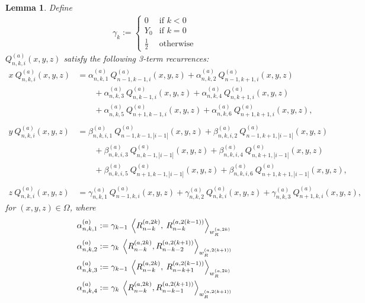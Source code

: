 \documentclass[11pt, oneside]{article}   	%
\newcommand{\half}{\frac{1}{2}}
\newcommand{\genjac}{R}
\newcommand{\genjacnmk}{\genjac_{n-k}}
\newcommand{\genjacw}{w_\genjac}
\newcommand{\scop}{Q}
\newcommand{\scopnki}{\scop_{n,k,i}}
\newcommand{\scopa}{\scop^{(a)}}
\newcommand{\scopnkia}{\scopnki^{(a)}}
\newcommand{\ch}{Y}
\newcommand{\alphaa}{\alpha^{(a)}}
\newcommand{\betaa}{\beta^{(a)}}
\newcommand{\gammaa}{\gamma^{(a)}}
\newtheorem{lemma}{Lemma}
\begin{document}
\begin{lemma}\label{lemma:Qrecurrence} 
Define
\begin{align}
	\gamma_{k} :=
		\begin{cases}
			0 &\text{if } k < 0 \\
			\ch_0 &\text{if } k = 0 \\
			\half &\text{otherwise}
		\end{cases}
\end{align}
$\scopnkia(x,y,z)$ satisfy the following 3-term recurrences:
\begin{align*}
	x \: \scopnkia(x,y,z) &= \alphaa_{n,k,1} \:  \scopa_{n-1, k-1, i}(x, y, z) + \alphaa_{n,k,2} \:  \scopa_{n-1, k+1, i}(x, y, z) \nonumber \\
		& \quad \quad + \alphaa_{n,k,3} \:  \scopa_{n, k-1, i}(x, y, z) + \alphaa_{n,k,4} \:  \scopa_{n, k+1, i}(x, y, z) \nonumber \\
		& \quad \quad + \alphaa_{n,k,5} \:  \scopa_{n+1, k-1, i}(x, y, z) + \alphaa_{n,k,6} \:  \scopa_{n+1, k+1, i}(x, y, z), \\ \\
	y \: \scopnkia(x,y,z) &= \betaa_{n,k,i,1} \:  \scopa_{n-1, k-1, |i-1|}(x, y, z) + \betaa_{n,k,i,2} \:  \scopa_{n-1, k+1, |i-1|}(x, y, z) \nonumber \\
		& \quad \quad + \betaa_{n,k,i,3} \:  \scopa_{n, k-1, |i-1|}(x, y, z) + \betaa_{n,k,i,4} \:  \scopa_{n, k+1, |i-1|}(x, y, z) \nonumber \\
		& \quad \quad + \betaa_{n,k,i,5} \:  \scopa_{n+1, k-1, |i-1|}(x, y, z) + \betaa_{n,k,i,6} \:  \scopa_{n+1, k+1, |i-1|}(x, y, z), \\ \\
	z \: \scopnkia(x,y,z) &= \gammaa_{n,k,1} \: \scopa_{n-1, k, i}(x, y, z) + \gammaa_{n,k,2} \: \scopa_{n, k, i}(x, y, z) + \gammaa_{n,k,3} \: \scopa_{n+1, k, i}(x, y, z),
\end{align*}
for $(x,y,z) \in \Omega$, where
\begin{align*}
	\alphaa_{n,k,1} &:= \gamma_{k-1} \: \ip<\genjacnmk^{(a, 2k)}, \: \genjacnmk^{(a, 2(k-1))}>_{\genjacw^{(a, 2k)}} \\
	\alphaa_{n,k,2} &:= \gamma_{k} \: \ip<\genjacnmk^{(a, 2k)}, \genjac_{n-k-2}^{(a, 2(k+1))}>_{\genjacw^{(a, 2(k+1))}} \\
	\alphaa_{n,k,3} &:=\gamma_{k-1} \: \ip<\genjacnmk^{(a, 2k)}, \: \genjac_{n-k+1}^{(a, 2(k-1))}>_{\genjacw^{(a, 2k)}} \\
	\alphaa_{n,k,4} &:= \gamma_{k} \: \ip<\genjacnmk^{(a, 2k)}, \genjac_{n-k-1}^{(a, 2(k+1))}>_{\genjacw^{(a, 2(k+1))}} \\

\end{align*}
\end{lemma}
\end{document}
